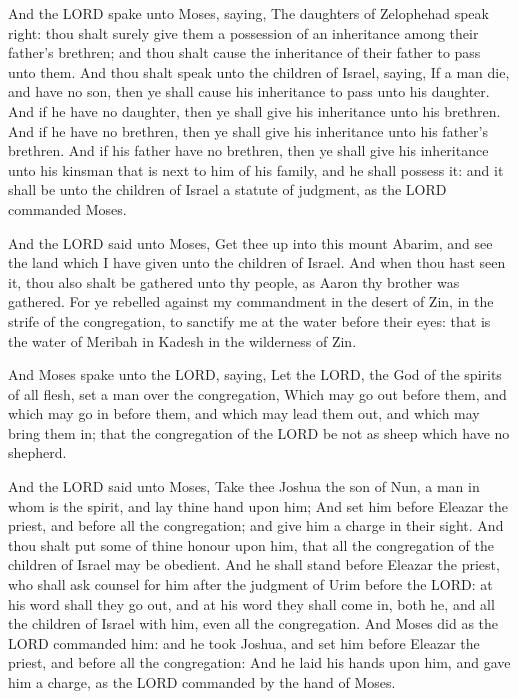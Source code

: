  And the LORD spake unto Moses, saying,  The
daughters of Zelophehad speak right: thou shalt surely give them a
possession of an inheritance among their father's brethren; and thou
shalt cause the inheritance of their father to pass unto them.
 And thou shalt speak unto the children of Israel, saying,
If a man die, and have no son, then ye shall cause his inheritance to
pass unto his daughter.  And if he have no daughter, then
ye shall give his inheritance unto his brethren.  And if
he have no brethren, then ye shall give his inheritance unto his
father's brethren.  And if his father have no brethren,
then ye shall give his inheritance unto his kinsman that is next to him
of his family, and he shall possess it: and it shall be unto the
children of Israel a statute of judgment, as the LORD commanded Moses.

 And the LORD said unto Moses, Get thee up into this
mount Abarim, and see the land which I have given unto the children of
Israel.  And when thou hast seen it, thou also shalt be
gathered unto thy people, as Aaron thy brother was gathered.
 For ye rebelled against my commandment in the desert of
Zin, in the strife of the congregation, to sanctify me at the water
before their eyes: that is the water of Meribah in Kadesh in the
wilderness of Zin.

 And Moses spake unto the LORD, saying, 
Let the LORD, the God of the spirits of all flesh, set a man over the
congregation,  Which may go out before them, and which
may go in before them, and which may lead them out, and which may bring
them in; that the congregation of the LORD be not as sheep which have no
shepherd.

 And the LORD said unto Moses, Take thee Joshua the son
of Nun, a man in whom is the spirit, and lay thine hand upon him;
 And set him before Eleazar the priest, and before all
the congregation; and give him a charge in their sight. 
And thou shalt put some of thine honour upon him, that all the
congregation of the children of Israel may be obedient. 
And he shall stand before Eleazar the priest, who shall ask counsel for
him after the judgment of Urim before the LORD: at his word shall they
go out, and at his word they shall come in, both he, and all the
children of Israel with him, even all the congregation. 
And Moses did as the LORD commanded him: and he took Joshua, and set him
before Eleazar the priest, and before all the congregation:
 And he laid his hands upon him, and gave him a charge,
as the LORD commanded by the hand of Moses.

